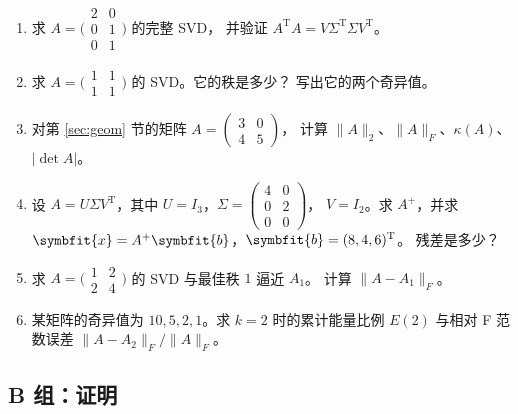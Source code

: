 \documentclass[UTF8, 11pt, a4paper, fontset=windows]{ctexart}
\theoremstyle{cnthm}
\theoremstyle{cndef}
\newcommand{\T}{^{\mathrm{T}}}
\newcommand{\nrm}[1]{\lVert #1 \rVert}
\newcommand{\abs}[1]{\lvert #1 \rvert}
\newcommand{\x}{\symbfit{x}}
\newcommand{\bb}{\symbfit{b}}
\begin{document}
\begin{enumerate}[label=\textbf{A\arabic*.}, leftmargin=3.0em, itemsep=0.6em]
  \item 求 $A=\bigl(\begin{smallmatrix}2&0\\0&1\\0&1\end{smallmatrix}\bigr)$ 的完整 SVD，
        并验证 $A\T A=V\Sigma\T\Sigma V\T$。

  \item 求 $A=\bigl(\begin{smallmatrix}1&1\\1&1\end{smallmatrix}\bigr)$ 的 SVD。它的秩是多少？
        写出它的两个奇异值。

  \item 对第 \ref{sec:geom} 节的矩阵 $A=\begin{pmatrix}3&0\\4&5\end{pmatrix}$，
        计算 $\nrm{A}_2$、$\nrm{A}_F$、$\kappa(A)$、$\abs{\det A}$。

  \item 设 $A=U\Sigma V\T$，其中
        $U=I_3$，$\Sigma=\begin{pmatrix}4&0\\0&2\\0&0\end{pmatrix}$，
        $V=I_2$。求 $A^{+}$，并求 $\x=A^{+}\bb$，$\bb=(8,4,6)\T$。
        残差是多少？

  \item 求 $A=\bigl(\begin{smallmatrix}1&2\\2&4\end{smallmatrix}\bigr)$ 的 SVD 与最佳秩 $1$ 逼近 $A_1$。
        计算 $\nrm{A-A_1}_F$。

  \item 某矩阵的奇异值为 $10,5,2,1$。求 $k=2$ 时的累计能量比例 $E(2)$
        与相对 F 范数误差 $\nrm{A-A_2}_F/\nrm{A}_F$。
\end{enumerate}

\subsection*{B 组：证明}
\end{document}
